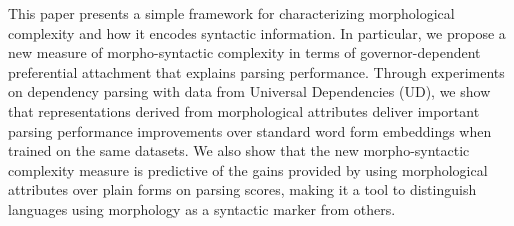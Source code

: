 This paper presents a simple framework for characterizing morphological complexity and how it encodes syntactic information. In particular, we propose a new measure of morpho-syntactic complexity in terms of governor-dependent preferential attachment that explains parsing performance. Through experiments on dependency parsing with data from Universal Dependencies (UD), we show that representations derived from morphological attributes deliver important parsing performance improvements over standard word form embeddings when trained on the same datasets. We also show that the new morpho-syntactic complexity measure is predictive of the gains provided by using morphological attributes over plain forms on parsing scores, making it a tool to distinguish languages using morphology as a syntactic marker from others.
